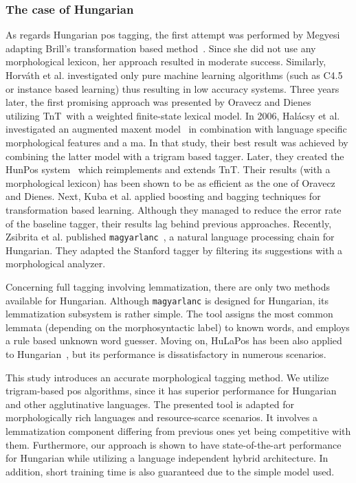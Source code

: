 \subsubsection{The case of Hungarian}

As regards Hungarian \gls{pos} tagging, the first attempt was performed by Megyesi~\cite{Megyesi1998} adapting Brill’s transformation based method~\cite{Brill1992}.
Since she did not use any morphological lexicon, her approach resulted in moderate success.
Similarly, Horváth et al. investigated \cite{Horvath1999} only pure machine learning algorithms (such as C4.5 or instance based learning) thus resulting in low accuracy systems.
Three years later, the first promising approach was presented by Oravecz and Dienes~\cite{Oravecz2002a} utilizing TnT~\cite{Brants2000}with a weighted finite-state lexical model.
In 2006, Halácsy et al. investigated an augmented \acrshort{maxent} model~\cite{Halacsy2006} in combination with language specific morphological features and a \acrshort{ma}.
In that study, their best result was achieved by combining the latter model with a trigram based tagger.
Later, they created the HunPos system~\cite{Halacsy2007} which reimplements and extends TnT.
Their results (with a morphological lexicon) has been shown to be as efficient as the one of Oravecz and Dienes.
Next, Kuba et al. applied boosting and bagging techniques for transformation based learning.
Although they managed to reduce the error rate of the baseline tagger, their results lag behind previous approaches.
Recently, Zsibrita et al. published \texttt{magyarlanc}~\cite{zsibrata2013magyarlanc}, a natural language processing chain for Hungarian.
They adapted the Stanford tagger by filtering its suggestions with a morphological analyzer. 

Concerning full tagging involving lemmatization, there are only two methods available for Hungarian.
Although \texttt{magyarlanc} is designed for Hungarian, its lemmatization subsystem is rather simple.
The tool assigns the most common lemmata (depending on the morphosyntactic label) to known words, and employs a rule based unknown word guesser.
Moving on, HuLaPos has been also applied to Hungarian~\cite{Laki2013}, but its performance is dissatisfactory in numerous scenarios. %

This study introduces an accurate morphological tagging method.
We utilize trigram-based \gls{pos} algorithms, since it has superior performance for Hungarian and other agglutinative languages.
The presented tool is adapted for morphologically rich languages and resource-scarce scenarios.
It involves a lemmatization component differing from previous ones yet being competitive with them.
Furthermore, our approach is shown to have state-of-the-art performance for Hungarian while utilizing a language independent hybrid architecture.
In addition, short training time is also guaranteed due to the simple model used.



